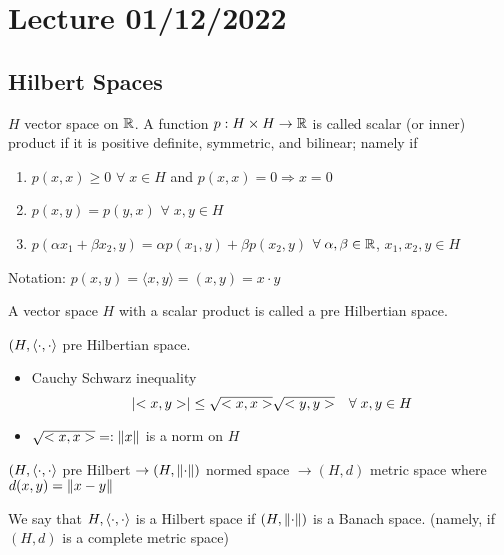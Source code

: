 \section{Lecture 01/12/2022}

\subsection*{Hilbert Spaces}

\begin{definition}
    \(H\) vector space on \(\mathbb{R}\). A function \(p:H \times H \to \mathbb{R}\) is called scalar (or inner) product if it is positive definite, symmetric, and bilinear; namely if 
    \begin{enumerate}
        \item \(p(x, x) \geq 0\) \(\forall \; x \in H\) and \(p(x, x) = 0 \Rightarrow x=0\)
        \item \(p(x, y) = p(y, x)\) \(\forall \; x, y \in H\)
        \item \(p(\alpha x_1 + \beta x_2, y) = \alpha p (x_1, y) + \beta p(x_2, y)\) \(\forall \; \alpha, \beta \in \mathbb{R}\), \(x_1, x_2, y \in H\)
    \end{enumerate}
\end{definition}

Notation: \(p(x, y) = \langle x, y \rangle = (x, y) = x \cdot y\)

\begin{definition}
    A vector space \(H\) with a scalar product is called a pre Hilbertian space.
\end{definition}

\begin{proposition}
    \((H, \langle \cdot,\cdot \rangle \) pre Hilbertian space.
    \begin{itemize}
        \item Cauchy Schwarz inequality \[
            \abs{<x, y>} \leq \sqrt{<x, x>} \sqrt{<y, y>} \quad \forall \; x, y \in H
        \]
        \item \(\sqrt{<x, x>} =: \norm{x}\) is a norm on \(H\)
    \end{itemize}
\end{proposition}

\((H, \langle \cdot,\cdot \rangle \) pre Hilbert \(\to (H, \norm{\cdot})\) normed space \(\to (H, d)\) metric space where \(d(x, y) = \norm{x-y}\)

\begin{definition}
    We say that \(H, \langle \cdot,\cdot \rangle\) is a Hilbert space if \((H, \norm{\cdot})\) is a Banach space. (namely, if \((H, d)\) is a complete metric space)
\end{definition}

